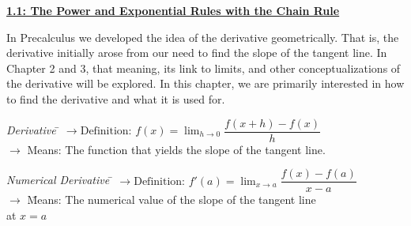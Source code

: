 \textbf{\underline{\large{1.1: The Power and Exponential Rules with the Chain Rule}}} \par

In Precalculus we developed the idea of the derivative geometrically. That is, the derivative initially arose from our need to find the slope of the tangent line. In Chapter 2 and 3, that meaning, its link to limits, and other conceptualizations of the derivative will be explored. In this chapter, we are primarily interested in how to find the derivative and what it is used for. \par

\begin{tcolorbox}[definition]
    \begin{tabbing}
        \textit{Derivative} \= $\rightarrow \text{Definition: } f(x) = \lim_{h \to 0} \dfrac{f(x + h) - f(x)}{h}$ \\[5.5pt]
        \> $\rightarrow$ {Means:  The function that yields the slope of the tangent line.}
    \end{tabbing} \vspace{11pt}
    \begin{tabbing}
        \textit{Numerical Derivative} \= $\rightarrow \text{Definition: } f'(a) = \lim_{x \to a} \dfrac{f(x) - f(a)}{x - a}$ \\[5.5pt]
        \> $\rightarrow$ \= Means: The numerical value of the slope of the tangent line \\
        \> \> at $x = a$ 
    \end{tabbing}
\end{tcolorbox}

\begin{center}  
\end{center}

